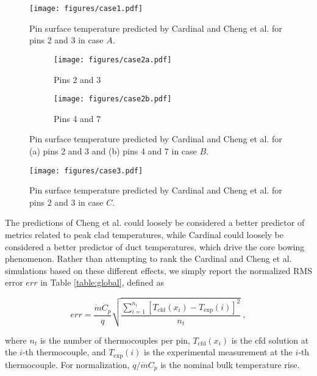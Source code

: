 \documentclass[3p,,preprint,11pt]{elsarticle}
\begin{document}
\begin{figure}[!htb]                                                                                                  
\centering
\texttt{[image: figures/case1.pdf]}
\caption{Pin surface temperature predicted by Cardinal and Cheng et al. \cite{cheng2009} for pins 2 and 3 in case $A$.}
\label{fig:validationa}
\end{figure}

\begin{figure}[!htb]
\centering
\begin{subfigure}{0.45\textwidth}
  \centering
  \texttt{[image: figures/case2a.pdf]}
  \caption{Pins 2 and 3}
\end{subfigure}
\begin{subfigure}{0.45\textwidth}
  \centering
  \texttt{[image: figures/case2b.pdf]}
  \caption{Pins 4 and 7}
\end{subfigure}
\caption{Pin surface temperature predicted by Cardinal and Cheng et al. \cite{cheng2009} for (a) pins 2 and 3 and (b) pins 4 and 7 in case $B$.}
\label{fig:validationb}
\end{figure}

\begin{figure}[!htb]                                                                                                  
\centering
\texttt{[image: figures/case3.pdf]}
\caption{Pin surface temperature predicted by Cardinal and Cheng et al. \cite{cheng2009} for pins 2 and 3 in case $C$.}
\label{fig:validationc}
\end{figure}

The predictions of Cheng et al. could loosely be considered a better predictor of metrics related to peak clad temperatures, while Cardinal could loosely be considered a better predictor of duct temperatures, which drive the core bowing phenomenon. Rather than attempting to rank the Cardinal and Cheng et al. simulations based on these different effects, we simply report the normalized RMS error $err$ in Table \ref{table:global}, defined as

\begin{equation}
err=\frac{\dot{m}C_p}{q}\sqrt{\frac{\sum_{i=1}^{n_t} \left\lbrack T_\text{cfd}(x_i)-T_\text{exp}(i)\right\rbrack^2}{n_t}}\ ,
\end{equation}

where $n_t$ is the number of thermocouples per pin, $T_\text{cfd}(x_i)$ is the \gls{cfd} solution at the $i$-th thermocouple, and $T_\text{exp}(i)$ is the experimental measurement at the $i$-th thermocouple. For normalization, $q/\dot{m}C_p$ is the nominal bulk temperature rise.
\end{document}
